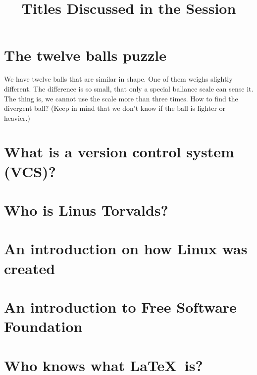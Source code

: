 \documentclass{article}
\begin{document}
\title{Titles Discussed in the Session}
\maketitle
\section{The twelve balls puzzle}
We have twelve balls that are similar in shape. One of them weighs slightly different. The difference is so small, that only a special ballance scale can sense it. The thing is, we cannot use the scale more than three times. How to find the divergent ball? (Keep in mind that we don't know if the ball is lighter or heavier.)
\section{What is a version control system (VCS)?}
\section{Who is Linus Torvalds?}
\section{An introduction on how Linux was created}
\section{An introduction to Free Software Foundation}
\section{Who knows what \LaTeX~is?}
\end{document}
